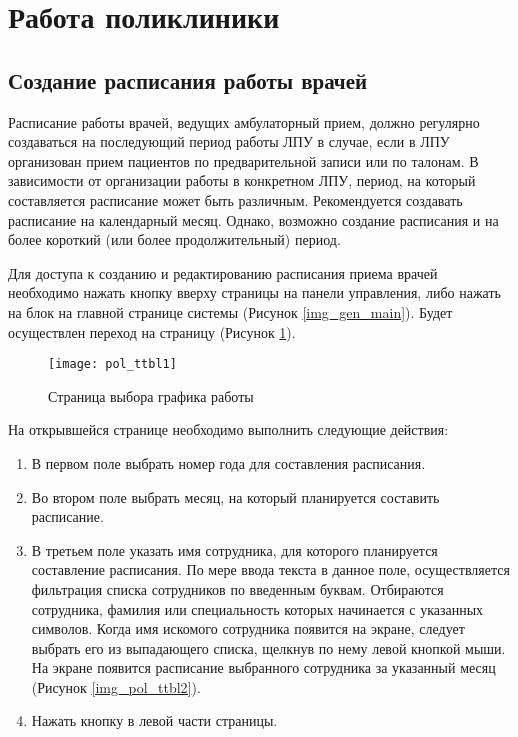 \newpage
\section{Работа поликлиники}

\subsection{Создание расписания работы врачей}

Расписание работы врачей, ведущих амбулаторный прием, должно регулярно создаваться на последующий период работы ЛПУ в случае, если в ЛПУ организован прием пациентов по предварительной записи или по талонам. В зависимости от организации работы в конкретном ЛПУ, период, на который составляется расписание может быть различным. Рекомендуется создавать расписание на календарный месяц. Однако, возможно создание расписания и на более короткий (или более продолжительный) период.

Для доступа к созданию и редактированию расписания приема врачей необходимо нажать кнопку  вверху страницы на панели управления, либо нажать на блок  на главной странице системы (Рисунок \ref{img_gen_main}). Будет осуществлен переход на страницу  (Рисунок \ref{img_pol_ttbl1}).

\begin{figure}[ht]\centering
 \texttt{[image: pol\_ttbl1]}
 \caption{Страница выбора графика работы}
 \label{img_pol_ttbl1}
\end{figure}

На открывшейся странице необходимо выполнить следующие действия:
\begin{enumerate}
 \item В первом поле выбрать номер года для составления расписания.
 \item Во втором поле выбрать месяц, на который планируется составить расписание.
 \item В третьем поле указать имя сотрудника, для которого планируется составление расписания. По мере ввода текста в данное поле, осуществляется фильтрация списка сотрудников по введенным буквам. Отбираются сотрудника, фамилия или специальность которых начинается с указанных символов. Когда имя искомого сотрудника появится на экране, следует выбрать его из выпадающего списка, щелкнув по нему левой кнопкой мыши. На экране появится расписание выбранного сотрудника за указанный месяц (Рисунок \ref{img_pol_ttbl2}).
 \item Нажать кнопку  в левой части страницы. 
\end{enumerate}

